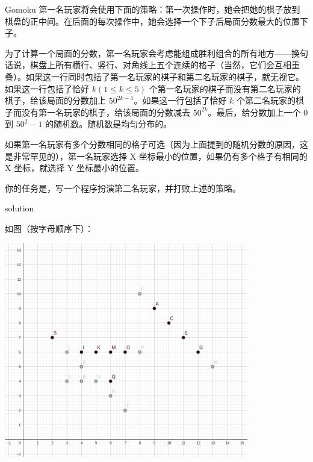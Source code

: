 \documentclass[10pt]{beamer}
\begin{document}
	\begin{frame}{Gomoku}
		第一名玩家将会使用下面的策略：第一次操作时，她会把她的棋子放到棋盘的正中间。在后面的每次操作中，她会选择一个下子后局面分数最大的位置下子。

		为了计算一个局面的分数，第一名玩家会考虑能组成胜利组合的所有地方——换句话说，棋盘上所有横行、竖行、对角线上五个连续的格子（当然，它们会互相重叠）。如果这一行同时包括了第一名玩家的棋子和第二名玩家的棋子，就无视它。如果这一行包括了恰好 $k (1\le k\le 5)$ 个第一名玩家的棋子而没有第二名玩家的棋子，给该局面的分数加上 $50^{2k−1}$。如果这一行包括了恰好 $k$ 个第二名玩家的棋子而没有第一名玩家的棋子，给该局面的分数减去 $50^{2k}$。最后，给分数加上一个 $0$ 到 $50^2−1$ 的随机数。随机数是均匀分布的。

		如果第一名玩家有多个分数相同的格子可选（因为上面提到的随机分数的原因，这是非常罕见的），第一名玩家选择 X 坐标最小的位置，如果仍有多个格子有相同的 X 坐标，就选择 Y 坐标最小的位置。

		你的任务是，写一个程序扮演第二名玩家，并打败上述的策略。
	\end{frame}
	\clearpage
	\begin{frame}{solution}
	
		如图（按字母顺序下）：

		\includegraphics[width=0.8\textwidth]{1.png}

	
	\end{frame}
\end{document}
